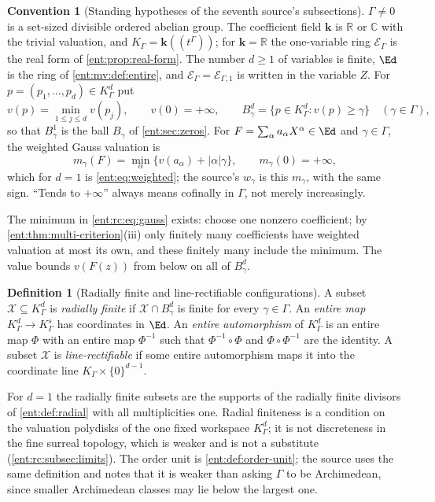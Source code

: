 \documentclass[11pt]{article}
\theoremstyle{plain}
\theoremstyle{plain}
\theoremstyle{plain}
\theoremstyle{definition}
\newtheorem{definition}[definition]{Definition}
\theoremstyle{definition}
\newtheorem{convention}[convention]{Convention}
\theoremstyle{definition}
\theoremstyle{definition}
\theoremstyle{remark}
\newcommand{\C}{\mathbb C}\newcommand{\R}{\mathbb R}
\newcommand{\K}{K_\Gamma}\newcommand{\KD}{K_\Delta}
\newcommand{\E}{\mathcal E_\Gamma}
\newcommand{\kk}{\mathbf k}\newcommand{\PP}{\mathbb P}
\begin{document}
\begin{convention}[Standing hypotheses of the seventh source's subsections]
\label{ent:rc:conv:standing}
$\Gamma\ne0$ is a set-sized divisible ordered abelian group. The coefficient
field $\kk$ is $\R$ or $\C$ with the trivial valuation, and
$\K=\kk((t^\Gamma))$; for $\kk=\R$ the one-variable ring $\E$ is the real
form of \cref{ent:prop:real-form}. The number $d\ge1$ of variables is finite,
$\Ed$ is the ring of \cref{ent:mv:def:entire}, and $\E=\mathcal E_{\Gamma,1}$
is written in the variable $Z$. For $p=(p_1,\ldots,p_d)\in\K^d$ put
\[
 v(p)=\min_{1\le j\le d}v(p_j),\qquad v(0)=+\infty,\qquad
 B^d_\gamma=\{p\in\K^d:v(p)\ge\gamma\}\quad(\gamma\in\Gamma),
\]
so that $B^1_\gamma$ is the ball $B_\gamma$ of \cref{ent:sec:zeros}. For
$F=\sum_\alpha a_\alpha X^\alpha\in\Ed$ and $\gamma\in\Gamma$, the weighted
Gauss valuation is
\begin{equation}\label{ent:rc:eq:gauss}
 m_\gamma(F)=\min_{\alpha}\{v(a_\alpha)+|\alpha|\gamma\},
 \qquad m_\gamma(0)=+\infty,
\end{equation}
which for $d=1$ is \eqref{ent:eq:weighted}; the source's $w_\gamma$ is this
$m_\gamma$, with the same sign. ``Tends to $+\infty$'' always means cofinally
in $\Gamma$, not merely increasingly.
\end{convention}

The minimum in \eqref{ent:rc:eq:gauss} exists: choose one nonzero
coefficient; by \cref{ent:thm:multi-criterion}(iii) only finitely many
coefficients have weighted valuation at most its own, and these finitely
many include the minimum. The value bounds $v(F(z))$ from below on all of
$B^d_\gamma$.

\begin{definition}[Radially finite and line-rectifiable configurations]
\label{ent:rc:def:rectifiable}
A subset $\mathcal X\subseteq\K^d$ is \emph{radially finite} if
$\mathcal X\cap B^d_\gamma$ is finite for every $\gamma\in\Gamma$. An
\emph{entire map} $\K^d\to\K^s$ has coordinates in $\Ed$. An \emph{entire
automorphism} of $\K^d$ is an entire map $\Phi$ with an entire map
$\Phi^{-1}$ such that $\Phi^{-1}\circ\Phi$ and $\Phi\circ\Phi^{-1}$ are the
identity. A subset $\mathcal X$ is \emph{line-rectifiable} if some entire
automorphism maps it into the coordinate line $\K\times\{0\}^{d-1}$.
\end{definition}

For $d=1$ the radially finite subsets are the supports of the radially finite
divisors of \cref{ent:def:radial} with all multiplicities one. Radial
finiteness is a condition on the valuation polydisks of the one fixed
workspace $\K^d$; it is not discreteness in the fine surreal topology, which
is weaker and is not a substitute (\cref{ent:rc:subsec:limits}). The order
unit is \cref{ent:def:order-unit}; the source uses the same definition and
notes that it is weaker than asking $\Gamma$ to be Archimedean, since smaller
Archimedean classes may lie below the largest one.
\end{document}
